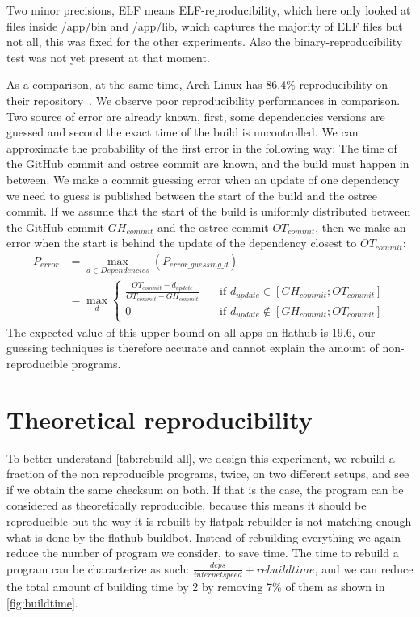 \documentclass[a4paper,11pt,oneside]{report}
\theoremstyle{definition}
\newcommand{\sysname}{flatpak-rebuilder\xspace}
\newcommand{\fh}{flathub\xspace}
\newcommand{\fhbb}{flathub buildbot\xspace}
\begin{document}
Two minor precisions, ELF means ELF-reproducibility, which here only looked at
files inside /app/bin and /app/lib, which captures the majority of ELF files
but not all, this was fixed for the other experiments. Also the
binary-reproducibility test was not yet present at that moment.

As a comparison, at the same time, Arch Linux has 86.4\% reproducibility on
their repository~\cite{arch-rebuilderd}. We observe poor reproducibility
performances in comparison. Two source of error are already known, first, some
dependencies versions are guessed and second the exact time of the build is
uncontrolled. We can approximate the probability of the first error in the
following way: The time of the GitHub commit and ostree commit are known, and
the build must happen in between. We make a commit guessing error when an
update of one dependency we need to guess is published between the start of the
build and the ostree commit. If we assume that the start of the build is
uniformly distributed between the GitHub commit $GH_{commit}$ and the ostree
commit $OT_{commit}$, then we make an error when the start is behind the update
of the dependency closest to $OT_{commit}$:
\begin{align}
    P_{error} &= \max_{d \in Dependencies}(P_{error\_guessing\_d}) \\
              &= \max_{d}
              \begin{cases}
                \frac{OT_{commit} - d_{update}}{OT_{commit} -
                    GH_{commit}}  & \quad \text{if } d_{update}
                    \in [GH_{commit}; OT_{commit}] \\
                0  & \quad \text{if } d_{update}
                  \notin [GH_{commit}; OT_{commit}]
              \end{cases}
\end{align}
The expected value of this upper-bound on all apps on \fh is $19.6$, our
guessing techniques is therefore accurate and cannot explain the amount of
non-reproducible programs.


\section{Theoretical reproducibility}
\label{sec:theo-repro}
To better understand \autoref{tab:rebuild-all}, we design this experiment, we
rebuild a fraction of the non reproducible programs, twice, on two different
setups, and see if we obtain the same checksum on both. If that is the case,
the program can be considered as theoretically reproducible, because this means
it should be reproducible but the way it is rebuilt by \sysname is not matching
enough what is done by the \fhbb. Instead of rebuilding everything we again
reduce the number of program we consider, to save time. The time to rebuild a
program can be characterize as such: $\frac{deps}{internet speed} + rebuild
time$, and we can reduce the total amount of building time by 2 by removing 7\%
of them as shown in \autoref{fig:buildtime}.
\end{document}
